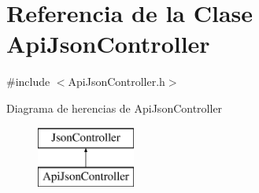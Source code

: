\hypertarget{classApiJsonController}{}\section{Referencia de la Clase Api\+Json\+Controller}
\label{classApiJsonController}


{\ttfamily \#include $<$Api\+Json\+Controller.\+h$>$}

Diagrama de herencias de Api\+Json\+Controller\begin{figure}[H]
\begin{center}
\leavevmode
\includegraphics[height=2.000000cm]{classApiJsonController}
\end{center}
\end{figure}
